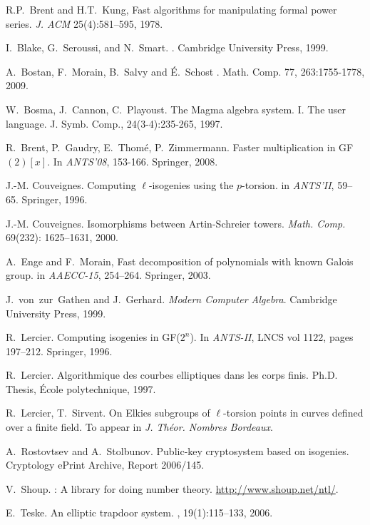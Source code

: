 
\scriptsize

\begin{thebibliography}{10}

R.P.~Brent and H.T.~Kung, Fast algorithms for
  manipulating formal power series.  \emph{J. ACM} 25(4):581--595, 1978.

  I.~Blake, G.~Seroussi, and N.~Smart.
  .
  \newblock Cambridge University Press, 1999.

  A.~Bostan, F.~Morain, B.~Salvy and É.~Schost
  .
  \newblock Math. Comp. 77, 263:1755-1778, 2009.

  W.~Bosma, J.~Cannon, C.~Playoust.
  \newblock The Magma algebra system. I. The user language.
  \newblock J. Symb. Comp., 24(3-4):235-265, 1997.
  
  R.~Brent, P.~Gaudry, E.~Thom{\'e}, P.~Zimmermann.
  \newblock Faster multi\-plication in GF$(2)[x]$.
  \newblock In {\em ANTS'08}, 153-166. Springer, 2008.

  J.-M. Couveignes. 
  \newblock Computing {$\ell$}-isogenies using the {$p$}-torsion.
  \newblock in {\em ANTS'II}, 59--65. Springer, 1996.

  J.-M. Couveignes. 
  \newblock Isomorphisms between {A}rtin-{S}chreier towers. 
  \newblock \emph{Math. Comp.} 69(232): 1625--1631, 2000.
  
  A.~Enge and F.~Morain,
  \newblock Fast decomposition of polynomials with known Galois group.
  \newblock in {\em AAECC-15}, 254--264. Springer, 2003.

  J.~von~zur~Gathen and J.~Gerhard. 
  \newblock \emph{Modern Computer Algebra}. 
  \newblock Cambridge University Press, 1999.

  R.~Lercier.
  \newblock Computing isogenies in GF($2^n$).
  \newblock In {\em ANTS-II}, LNCS vol 1122, pages 197--212. Springer, 1996.

  R.~Lercier.
  \newblock Algorithmique des courbes elliptiques dans les corps finis. 
  \newblock Ph.D. Thesis, {\'E}cole polytechnique, 1997.

  R.~Lercier, T.~Sirvent.
  \newblock On Elkies subgroups of $\ell$-torsion points in curves defined over
  a finite field.
  \newblock To appear in {\em J. Th\'eor. Nombres Bordeaux}.

  A.~Rostovtsev and A.~Stolbunov.
  \newblock Public-key cryptosystem based on isogenies.
  \newblock Cryptology ePrint Archive, Report 2006/145.
  
  V.~Shoup.
  : A library for doing number theory.
  \newblock \url{http://www.shoup.net/ntl/}.

  E.~Teske.
  \newblock An elliptic trapdoor system.
  , 19(1):115--133, 2006.
  
\end{thebibliography}
